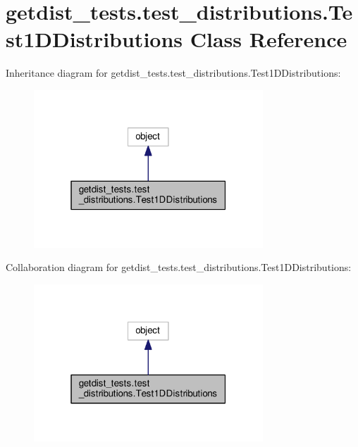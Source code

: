 \hypertarget{classgetdist__tests_1_1test__distributions_1_1Test1DDistributions}{}\section{getdist\+\_\+tests.\+test\+\_\+distributions.\+Test1\+D\+Distributions Class Reference}
\label{classgetdist__tests_1_1test__distributions_1_1Test1DDistributions}


Inheritance diagram for getdist\+\_\+tests.\+test\+\_\+distributions.\+Test1\+D\+Distributions\+:
\nopagebreak
\begin{figure}[H]
\begin{center}
\leavevmode
\includegraphics[width=244pt]{classgetdist__tests_1_1test__distributions_1_1Test1DDistributions__inherit__graph}
\end{center}
\end{figure}


Collaboration diagram for getdist\+\_\+tests.\+test\+\_\+distributions.\+Test1\+D\+Distributions\+:
\nopagebreak
\begin{figure}[H]
\begin{center}
\leavevmode
\includegraphics[width=244pt]{classgetdist__tests_1_1test__distributions_1_1Test1DDistributions__coll__graph}
\end{center}
\end{figure}
